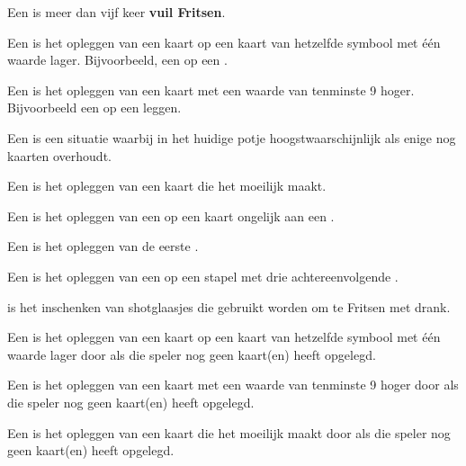 
\item Een  is meer dan vijf keer \textbf{vuil Fritsen}\footnotemark[2].

\item Een  is het opleggen van een kaart op een kaart van hetzelfde symbool met \'e\'en waarde lager. Bijvoorbeeld, een  op een .

\item Een  is het opleggen van een kaart met een waarde van tenminste 9 hoger. Bijvoorbeeld een  op een  leggen.

\item Een  is een situatie waarbij \eenSpeler in het huidige potje hoogstwaarschijnlijk als enige nog kaarten overhoudt.

\item Een  is het opleggen van een kaart die het \andereSpelers moeilijk maakt.

\item Een  is het opleggen van een  op een kaart ongelijk aan een .

\item Een  is het opleggen van de eerste .

\item Een  is het opleggen van een  op een stapel met drie achtereenvolgende .

\item {} is het inschenken van shotglaasjes die gebruikt worden om te Fritsen met drank.

\item Een  is het opleggen van een kaart op een kaart van hetzelfde symbool met \'e\'en waarde lager door \Willem als die speler nog geen kaart(en) heeft opgelegd.

\item Een  is het opleggen van een kaart met een waarde van tenminste 9 hoger door \Willem als die speler nog geen kaart(en) heeft opgelegd.

\item Een  is het opleggen van een kaart die het \andereSpelers moeilijk maakt door \Willem als die speler nog geen kaart(en) heeft opgelegd.

